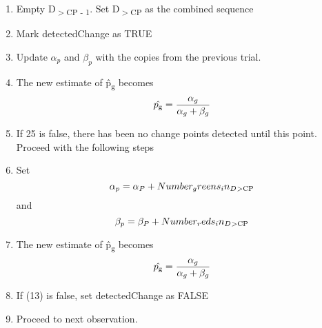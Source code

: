 \documentclass{article}
\begin{document}
\begin{enumerate}
\item Empty D\textsubscript{$>$CP - 1}. Set D\textsubscript{$>$CP} as the combined sequence	

\item Mark detectedChange as TRUE

\item Update $\alpha_p$ and $\beta_p$ with the copies from the previous trial.

\item The new estimate of \^{p\textsubscript{g}} becomes \[ \hat{p\textsubscript{g}} = \frac{\alpha_g}{\alpha_g + \beta_g} \]

\item If 25 is false, there has been no change points detected until this point. Proceed with the following steps

\item Set 
\[ \alpha_p = \alpha_P + Number_greens_in_D\textsubscript{$>$CP}\] and
\[ \beta_p = \beta_P + Number_reds_in_D\textsubscript{$>$CP}\]

\item The new estimate of \^{p\textsubscript{g}} becomes \[ \hat{p\textsubscript{g}} = \frac{\alpha_g}{\alpha_g + \beta_g} \]

\item If (13) is false, set detectedChange as FALSE

\item Proceed to next observation.
\end{enumerate}
\end{document}
